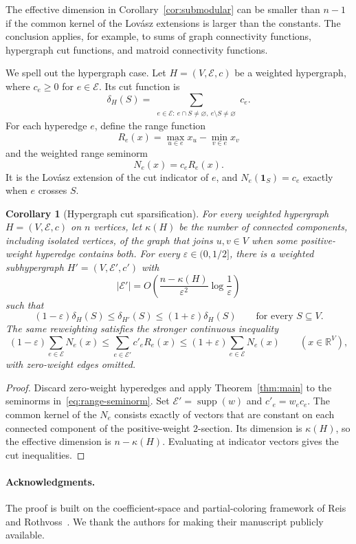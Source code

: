 \documentclass[11pt]{article}
\newtheorem{corollary}[theorem]{Corollary}
\theoremstyle{remark}
\newcommand{\R}{\mathbb{R}}
\newcommand{\supp}{\operatorname{supp}}
\newcommand{\eps}{\varepsilon}
\newcommand{\one}{\bm{1}}
\begin{document}
The effective dimension in Corollary~\ref{cor:submodular} can be
smaller than $n-1$ if the common kernel of the Lov\'asz extensions is
larger than the constants.  The conclusion applies, for example, to
sums of graph connectivity functions, hypergraph cut functions, and
matroid connectivity functions.

We spell out the hypergraph case.  Let $H=(V,\mathcal E,c)$ be a
weighted hypergraph, where $c_e\geq0$ for $e\in\mathcal E$.  Its cut
function is
\[
  \delta_H(S)=
  \sum_{\substack{e\in\mathcal E:\
  e\cap S\neq\varnothing,\ e\setminus S\neq\varnothing}}c_e.
\]
For each hyperedge $e$, define the range function
\[
  R_e(x)=\max_{u\in e}x_u-\min_{v\in e}x_v
\]
and the weighted range seminorm
\begin{equation}\label{eq:range-seminorm}
  N_e(x)=c_eR_e(x).
\end{equation}
It is the Lov\'asz extension of the cut indicator of $e$, and
$N_e(\one_S)=c_e$ exactly when $e$ crosses $S$.

\begin{corollary}[Hypergraph cut sparsification]
\label{cor:hypergraph}
For every weighted hypergraph $H=(V,\mathcal E,c)$ on $n$ vertices,
let $\kappa(H)$ be the number of connected components, including
isolated vertices, of the graph that joins $u,v\in V$ when some
positive-weight hyperedge contains both.  For every
$\eps\in(0,1/2]$, there is a weighted subhypergraph
$H'=(V,\mathcal E',c')$ with
\[
  |\mathcal E'|=O\!\left(\frac{n-\kappa(H)}{\eps^2}
  \log\frac1\eps\right)
\]
such that
\[
  (1-\eps)\delta_H(S)\leq\delta_{H'}(S)
  \leq(1+\eps)\delta_H(S)
  \qquad\text{for every }S\subseteq V.
\]
The same reweighting satisfies the stronger continuous inequality
\[
  (1-\eps)\sum_{e\in\mathcal E}N_e(x)
  \leq\sum_{e\in\mathcal E'}c'_eR_e(x)
  \leq(1+\eps)\sum_{e\in\mathcal E}N_e(x)
  \qquad(x\in\R^V),
\]
with zero-weight edges omitted.
\end{corollary}

\begin{proof}
Discard zero-weight hyperedges and apply Theorem~\ref{thm:main} to the
seminorms in~\eqref{eq:range-seminorm}.  Set
$\mathcal E'=\supp(w)$ and $c'_e=w_ec_e$.  The common kernel of the
$N_e$ consists exactly of vectors that are constant on each connected
component of the positive-weight $2$-section.  Its dimension is
$\kappa(H)$, so the effective dimension is $n-\kappa(H)$.  Evaluating
at indicator vectors gives the cut inequalities.
\end{proof}

\paragraph{Acknowledgments.}
The proof is built on the coefficient-space and partial-coloring
framework of Reis and Rothvoss~\cite{RR26}.  We thank the authors for
making their manuscript publicly available.



\end{document}

